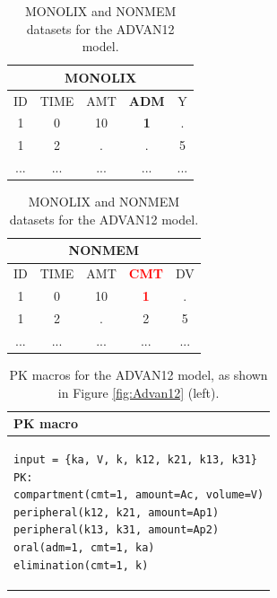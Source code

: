 \begin{table}[ht!]
\footnotesize
\parbox{.5\linewidth}{
\centering
\begin{tabular}{ccccc}
  \hline
   \multicolumn{5}{c}{\textbf{MONOLIX}} \\
  \hline
ID & TIME & AMT & \textbf{ADM} & Y \\
  \hline
1  & 0        & 10   & \textbf{1} & .       \\
1  & 2        & .      & . 	& 5        \\
... &  ...      &  ...   &  ...  &  ...     \\
\end{tabular}
}
\hfill
\parbox{.5\linewidth}{
\centering
\begin{tabular}{ccccc}
  \hline
   \multicolumn{5}{c}{\textbf{NONMEM}} \\
  \hline
ID & TIME & AMT & \textbf{\textcolor{red}{CMT}} & DV \\
  \hline
1  & 0        & 10   & \textbf{\textcolor{red}{1}}   & .    \\
1  & 2        & .      & 2    & 5   \\
... &  ...      &  ...   &  ... & ...  \\
\end{tabular}
}
\caption{MONOLIX and NONMEM datasets for the ADVAN12 model.}
\end{table}


\begin{table}[h!]
\setlength{\tabcolsep}{15pt}
\begin{center}
\begin{tabular}{l}
  \hline \hline
PK macro \\[-.25ex]
  \hline
\lstset{language=NONMEMdataSet}
\begin{lstlisting}
input = {ka, V, k, k12, k21, k13, k31}
PK:
compartment(cmt=1, amount=Ac, volume=V)
peripheral(k12, k21, amount=Ap1)
peripheral(k13, k31, amount=Ap2)
oral(adm=1, cmt=1, ka)
elimination(cmt=1, k)
\end{lstlisting}
\\
  \hline
\end{tabular}
\caption{PK macros  for the ADVAN12 model, as shown in Figure \ref{fig:Advan12} (left).}
\label{tab:advan12Table}
\end{center}
\end{table}


